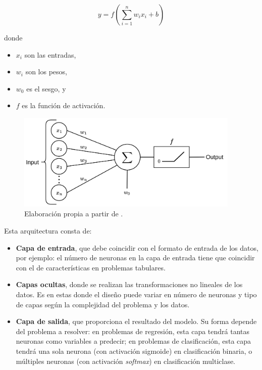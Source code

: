 $$
y = f \left( \sum_{i=1}^n{w_ix_i+b} \right)
$$

donde
\begin{itemize}
    \item $x_i$ son las entradas,
    \item $w_i$ son los pesos,
    \item $w_0$ es el sesgo, y
    \item $f$ es la función de activación.
\end{itemize}



\begin{figure}[h]
    \centering
    \includegraphics[width=0.95\textwidth]{capitulos/cap_02/imagenes/Neuron_perceptron.png}
    \caption{Elaboración propia a partir de \cite{domingos2018}.} 
    \label{fig:neuron_MLP}
\end{figure}

Esta arquitectura consta de:

\begin{itemize}

    \item \textbf{Capa de entrada}, que debe coincidir con el formato de entrada de los datos, por ejemplo: el
    número de neuronas en la capa de entrada tiene que coincidir con el de características en problemas tabulares.
    
    \item \textbf{Capas ocultas}, donde se realizan las transformaciones no lineales de los datos. Es en estas 
    donde el diseño puede variar en número de neuronas y tipo de capas según la complejidad del problema y los datos.
    
    \item \textbf{Capa de salida}, que proporciona el resultado del modelo. Su forma depende del problema a 
    resolver: en problemas de regresión, esta capa tendrá tantas neuronas como variables a predecir; en problemas de 
    clasificación, esta capa tendrá una sola neurona (con activación sigmoide) en clasificación binaria, o múltiples 
    neuronas (con activación \textit{softmax}) en clasificación multiclase.

\end{itemize}

